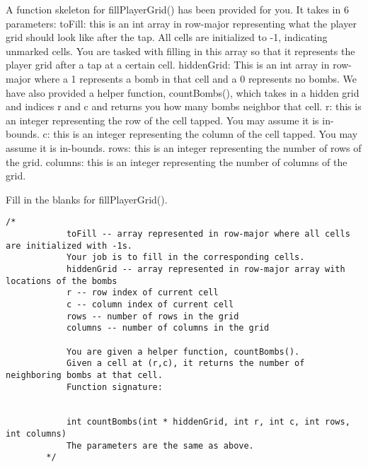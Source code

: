 \documentclass{article}
\begin{document}
\begin{enumerate}[label=(\alph*)]
    A function skeleton for fillPlayerGrid() has been provided for you. It takes in 6 parameters: \newline \newline
    toFill: this is an int array in row-major representing what the player grid should look like after the tap. All cells are initialized to -1, indicating unmarked cells. You are tasked with filling in this array so that it represents the player grid after a tap at a certain cell. \newline \newline
    hiddenGrid: This is an int array in row-major where a 1 represents a bomb in that cell and a 0 represents no bombs. 
    We have also provided a helper function, countBombs(), which takes in a hidden grid and indices r and c and returns you how many bombs neighbor that cell.  \newline \newline
    r: this is an integer representing the row of the cell tapped. You may assume it is in-bounds. \newline \newline
    c: this is an integer representing the column of the cell tapped. You may assume it is in-bounds.\newline \newline
    rows: this is an integer representing the number of rows of the grid. \newline \newline
    columns: this is an integer representing the number of columns of the grid.
    
    Fill in the blanks for fillPlayerGrid().

    \begin{lstlisting}[style=CStyle]
        /*
            toFill -- array represented in row-major where all cells are initialized with -1s. 
            Your job is to fill in the corresponding cells.
            hiddenGrid -- array represented in row-major array with locations of the bombs
            r -- row index of current cell
            c -- column index of current cell
            rows -- number of rows in the grid
            columns -- number of columns in the grid
    
            You are given a helper function, countBombs(). 
            Given a cell at (r,c), it returns the number of neighboring bombs at that cell.
            Function signature:


            int countBombs(int * hiddenGrid, int r, int c, int rows, int columns)
            The parameters are the same as above.
        */


\end{lstlisting}
\end{enumerate}
\end{document}
